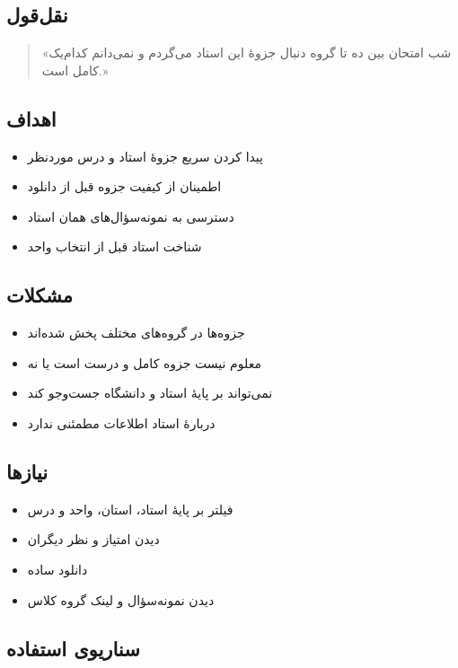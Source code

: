 \documentclass[12pt, a4paper]{article}
\begin{document}
\subsection{نقل‌قول}

\begin{quote}
«شب امتحان بین ده تا گروه دنبال جزوهٔ این استاد می‌گردم و نمی‌دانم کدام‌یک کامل است.»
\end{quote}

\subsection{اهداف}

\begin{itemize}
\tightlist
\item
  پیدا کردن سریع جزوهٔ استاد و درس موردنظر
\item
  اطمینان از کیفیت جزوه قبل از دانلود
\item
  دسترسی به نمونه‌سؤال‌های همان استاد
\item
  شناخت استاد قبل از انتخاب واحد
\end{itemize}

\subsection{مشکلات}

\begin{itemize}
\tightlist
\item
  جزوه‌ها در گروه‌های مختلف پخش شده‌اند
\item
  معلوم نیست جزوه کامل و درست است یا نه
\item
  نمی‌تواند بر پایهٔ استاد و دانشگاه جست‌وجو کند
\item
  دربارهٔ استاد اطلاعات مطمئنی ندارد
\end{itemize}

\subsection{نیازها}

\begin{itemize}
\tightlist
\item
  فیلتر بر پایهٔ استاد، استان، واحد و درس
\item
  دیدن امتیاز و نظر دیگران
\item
  دانلود ساده
\item
  دیدن نمونه‌سؤال و لینک گروه کلاس
\end{itemize}

\subsection{سناریوی استفاده}
\end{document}
